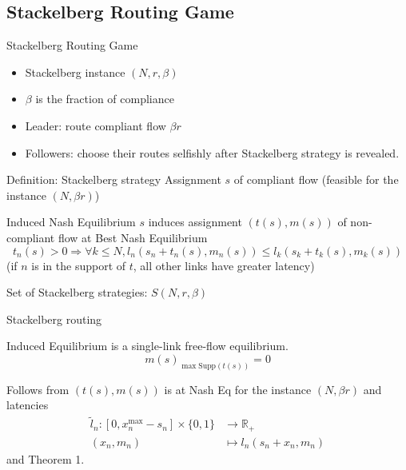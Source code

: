 \documentclass[xcolor=svgnames, english, smaller]{beamer}
\theoremstyle{plain}
\theoremstyle{definition}
\theoremstyle{plain}
\theoremstyle{plain}
\begin{document}
\subsection{Stackelberg Routing Game}

\begin{frame}{Stackelberg Routing Game}

\begin{itemize}
\item Stackelberg instance $(N, r, \beta)$
\item $\beta$ is the fraction of compliance
\item Leader: route compliant flow $\beta r$
\item Followers: choose their routes selfishly after Stackelberg strategy is revealed.
\end{itemize}


\begin{block}{Definition: Stackelberg strategy}
Assignment $s$ of compliant flow (feasible for the instance $(N,\beta r)$)
\end{block}

\begin{block}{Induced Nash Equilibrium}
$s$ induces assignment $(t(s), m(s))$ of non-compliant flow at Best Nash Equilibrium
\[
t_n(s)>0 \Rightarrow \forall k \leq N, l_n(s_n + t_n(s), m_n(s)) \leq l_k(s_k + t_k(s), m_k(s))
\]
(if $n$ is in the support of $t$, all other links have greater latency)
\end{block}

Set of Stackelberg strategies: $S(N, r, \beta)$

\end{frame}


\begin{frame}{Stackelberg routing}

\begin{lemma}
Induced Equilibrium is a single-link free-flow equilibrium.
\[
m(s)_{\max \text{Supp}(t(s))} = 0
\]
\end{lemma}

Follows from $(t(s), m(s))$ is at Nash Eq for the instance $(N,\beta r)$ and latencies
\begin{align*}
\tilde{l}_n: [0, x_n^{\max} - s_n]\times \{0,1\} & \rightarrow \mathbb{R}_+\\
(x_n,m_n) & \mapsto l_n(s_n+x_n,m_n)
\end{align*}
and Theorem 1.

\end{frame}
\end{document}
